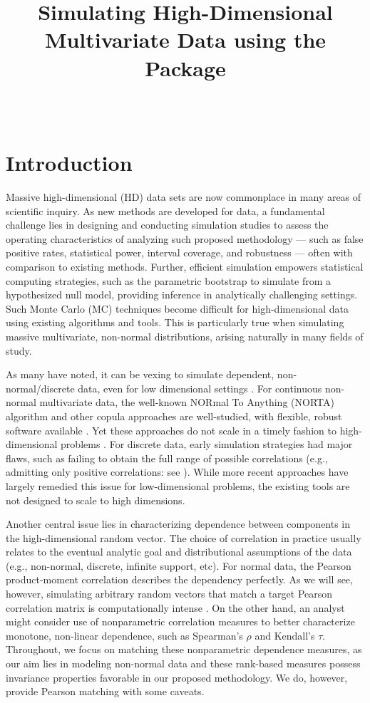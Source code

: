 \documentclass[
]{jss}
\author{
\\
}
\title{Simulating High-Dimensional Multivariate Data using the \pkg{Bigsimr} Package}
\begin{document}
\newpage

\hypertarget{introduction}{%
\section{Introduction}\label{introduction}}

Massive high-dimensional (HD) data sets are now commonplace in many areas of scientific inquiry. As new methods are developed for data, a fundamental challenge lies in designing and conducting simulation studies to assess the operating characteristics of analyzing such proposed methodology --- such as false positive rates, statistical power, interval coverage, and robustness --- often with comparison to existing methods. Further, efficient simulation empowers statistical computing strategies, such as the parametric bootstrap \citep{Chernick2008} to simulate from a hypothesized null model, providing inference in analytically challenging settings. Such Monte Carlo (MC) techniques become difficult for high-dimensional data using existing algorithms and tools. This is particularly true when simulating massive multivariate, non-normal distributions, arising naturally in many fields of study.

As many have noted, it can be vexing to simulate dependent, non-normal/discrete data, even for low dimensional settings \citep{MB13, XZ19}. For continuous non-normal multivariate data, the well-known NORmal To Anything (NORTA) algorithm \citep{Cario1997} and other copula approaches \citep{Nelsen2007} are well-studied, with flexible, robust software available \citep{Yan2007, Chen2001}. Yet these approaches do not scale in a timely fashion to high-dimensional problems \citep{Li2019gpu}. For discrete data, early simulation strategies had major flaws, such as failing to obtain the full range of possible correlations (e.g., admitting only positive correlations: see \citet{Park1996}). While more recent approaches \citep{MB13, Xia17, BF17} have largely remedied this issue for low-dimensional problems, the existing tools are not designed to scale to high dimensions.

Another central issue lies in characterizing dependence between components in the high-dimensional random vector. The choice of correlation in practice usually relates to the eventual analytic goal and distributional assumptions of the data (e.g., non-normal, discrete, infinite support, etc). For normal data, the Pearson product-moment correlation describes the dependency perfectly. As we will see, however, simulating arbitrary random vectors that match a target Pearson correlation matrix is computationally intense \citep{Chen2001, Xia17}. On the other hand, an analyst might consider use of nonparametric correlation measures to better characterize monotone, non-linear dependence, such as Spearman's \(\rho\) and Kendall's \(\tau\). Throughout, we focus on matching these nonparametric dependence measures, as our aim lies in modeling non-normal data and these rank-based measures possess invariance properties favorable in our proposed methodology. We do, however, provide Pearson matching with some caveats.
\end{document}
